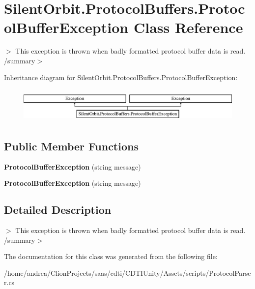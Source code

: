 \hypertarget{class_silent_orbit_1_1_protocol_buffers_1_1_protocol_buffer_exception}{}\section{Silent\+Orbit.\+Protocol\+Buffers.\+Protocol\+Buffer\+Exception Class Reference}
\label{class_silent_orbit_1_1_protocol_buffers_1_1_protocol_buffer_exception}


$>$ This exception is thrown when badly formatted protocol buffer data is read. /summary$>$  


Inheritance diagram for Silent\+Orbit.\+Protocol\+Buffers.\+Protocol\+Buffer\+Exception\+:\begin{figure}[H]
\begin{center}
\leavevmode
\includegraphics[height=1.794872cm]{class_silent_orbit_1_1_protocol_buffers_1_1_protocol_buffer_exception}
\end{center}
\end{figure}
\subsection*{Public Member Functions}
\begin{DoxyCompactItemize}
\item 
{\bfseries Protocol\+Buffer\+Exception} (string message)\hypertarget{class_silent_orbit_1_1_protocol_buffers_1_1_protocol_buffer_exception_a6028c070a3feff745b455ff61e9fd616}{}\label{class_silent_orbit_1_1_protocol_buffers_1_1_protocol_buffer_exception_a6028c070a3feff745b455ff61e9fd616}

\item 
{\bfseries Protocol\+Buffer\+Exception} (string message)\hypertarget{class_silent_orbit_1_1_protocol_buffers_1_1_protocol_buffer_exception_a6028c070a3feff745b455ff61e9fd616}{}\label{class_silent_orbit_1_1_protocol_buffers_1_1_protocol_buffer_exception_a6028c070a3feff745b455ff61e9fd616}

\end{DoxyCompactItemize}


\subsection{Detailed Description}
$>$ This exception is thrown when badly formatted protocol buffer data is read. /summary$>$ 

The documentation for this class was generated from the following file\+:\begin{DoxyCompactItemize}
\item 
/home/andrea/\+Clion\+Projects/saas/cdti/\+C\+D\+T\+I\+Unity/\+Assets/scripts/Protocol\+Parser.\+cs\end{DoxyCompactItemize}
